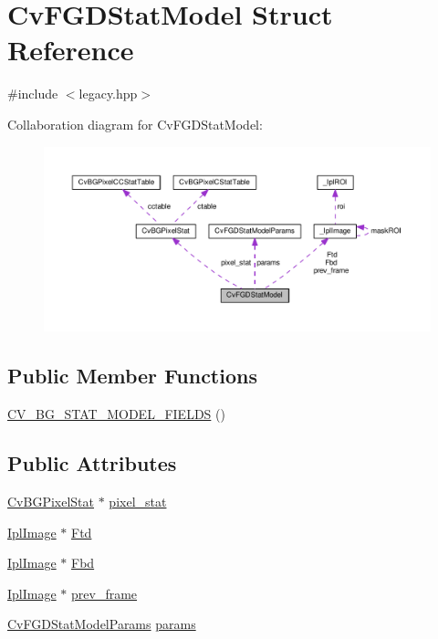 \hypertarget{structCvFGDStatModel}{\section{Cv\-F\-G\-D\-Stat\-Model Struct Reference}
\label{structCvFGDStatModel}
}


{\ttfamily \#include $<$legacy.\-hpp$>$}



Collaboration diagram for Cv\-F\-G\-D\-Stat\-Model\-:\nopagebreak
\begin{figure}[H]
\begin{center}
\leavevmode
\includegraphics[width=350pt]{structCvFGDStatModel__coll__graph}
\end{center}
\end{figure}
\subsection*{Public Member Functions}
\begin{DoxyCompactItemize}
\item 
\hyperlink{structCvFGDStatModel_ad84bac405da65af0563abe5911132fa2}{C\-V\-\_\-\-B\-G\-\_\-\-S\-T\-A\-T\-\_\-\-M\-O\-D\-E\-L\-\_\-\-F\-I\-E\-L\-D\-S} ()
\end{DoxyCompactItemize}
\subsection*{Public Attributes}
\begin{DoxyCompactItemize}
\item 
\hyperlink{structCvBGPixelStat}{Cv\-B\-G\-Pixel\-Stat} $\ast$ \hyperlink{structCvFGDStatModel_a1a6802be9cad34649a3b06acf5294123}{pixel\-\_\-stat}
\item 
\hyperlink{core_2types__c_8h_a249298f383f3b430b476542076320c57}{Ipl\-Image} $\ast$ \hyperlink{structCvFGDStatModel_a802484fd8cbf4cd8415b3a96e96b1164}{Ftd}
\item 
\hyperlink{core_2types__c_8h_a249298f383f3b430b476542076320c57}{Ipl\-Image} $\ast$ \hyperlink{structCvFGDStatModel_a29b2bf55e927fb67b65876cda6f1f200}{Fbd}
\item 
\hyperlink{core_2types__c_8h_a249298f383f3b430b476542076320c57}{Ipl\-Image} $\ast$ \hyperlink{structCvFGDStatModel_a5408042c3fe0246dc047c215397a818f}{prev\-\_\-frame}
\item 
\hyperlink{structCvFGDStatModelParams}{Cv\-F\-G\-D\-Stat\-Model\-Params} \hyperlink{structCvFGDStatModel_abd344f6b9f653ab49fde74d80cbce7aa}{params}
\end{DoxyCompactItemize}



